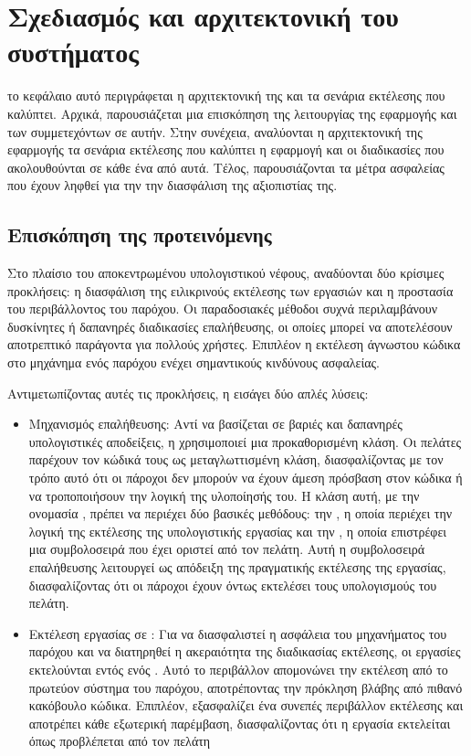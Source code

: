 \chapter{Σχεδιασμός και αρχιτεκτονική του συστήματος}
το κεφάλαιο αυτό περιγράφεται η αρχιτεκτονική της  και τα σενάρια εκτέλεσης που καλύπτει. Αρχικά, παρουσιάζεται μια επισκόπηση της λειτουργίας της εφαρμογής και των συμμετεχόντων σε αυτήν. Στην συνέχεια, αναλύονται η αρχιτεκτονική της εφαρμογής τα σενάρια εκτέλεσης που καλύπτει η εφαρμογή και οι διαδικασίες που ακολουθούνται σε κάθε ένα από αυτά. Τέλος, παρουσιάζονται τα μέτρα ασφαλείας που έχουν ληφθεί για την την διασφάλιση της αξιοπιστίας της.

\section{Επισκόπηση της προτεινόμενης }

Στο πλαίσιο του αποκεντρωμένου υπολογιστικού νέφους, αναδύονται 
δύο κρίσιμες προκλήσεις: η διασφάλιση της ειλικρινούς εκτέλεσης των εργασιών 
και η προστασία του περιβάλλοντος του παρόχου. Οι παραδοσιακές μέθοδοι συχνά 
περιλαμβάνουν δυσκίνητες ή δαπανηρές διαδικασίες επαλήθευσης, οι οποίες μπορεί 
να αποτελέσουν αποτρεπτικό παράγοντα για πολλούς χρήστες. Επιπλέον η εκτέλεση 
άγνωστου κώδικα στο μηχάνημα ενός παρόχου ενέχει σημαντικούς κινδύνους ασφαλείας.

Αντιμετωπίζοντας αυτές τις προκλήσεις, η  εισάγει δύο απλές λύσεις:
\begin{itemize}
\item Μηχανισμός επαλήθευσης: Αντί να βασίζεται σε βαριές και δαπανηρές 
υπολογιστικές αποδείξεις, η  χρησιμοποιεί μια προκαθορισμένη  κλάση. 
Οι πελάτες παρέχουν τον κώδικά τους ως μεταγλωττισμένη  κλάση, διασφαλίζοντας 
με τον τρόπο αυτό ότι οι πάροχοι δεν μπορούν να έχουν άμεση πρόσβαση στον κώδικα 
ή να τροποποιήσουν την λογική της υλοποίησής του. Η κλάση αυτή, με την ονομασία 
\textit{}, πρέπει να περιέχει δύο βασικές  μεθόδους: την \textit{}, η οποία περιέχει την λογική της εκτέλεσης της υπολογιστικής εργασίας και την \textit{}, η οποία επιστρέφει μια συμβολοσειρά που έχει οριστεί από τον πελάτη. Αυτή η συμβολοσειρά επαλήθευσης λειτουργεί ως απόδειξη της πραγματικής εκτέλεσης της εργασίας, διασφαλίζοντας ότι οι πάροχοι έχουν όντως εκτελέσει τους υπολογισμούς του πελάτη.
\item Εκτέλεση εργασίας σε : Για να διασφαλιστεί η ασφάλεια του μηχανήματος του παρόχου και να διατηρηθεί η ακεραιότητα της διαδικασίας εκτέλεσης, οι εργασίες εκτελούνται εντός ενός . Αυτό το  περιβάλλον απομονώνει την εκτέλεση από το πρωτεύον σύστημα του παρόχου, αποτρέποντας την πρόκληση βλάβης από πιθανό κακόβουλο κώδικα. Επιπλέον, εξασφαλίζει ένα συνεπές περιβάλλον εκτέλεσης και αποτρέπει κάθε εξωτερική παρέμβαση, διασφαλίζοντας ότι η εργασία εκτελείται όπως προβλέπεται από τον πελάτη 
\end{itemize}

